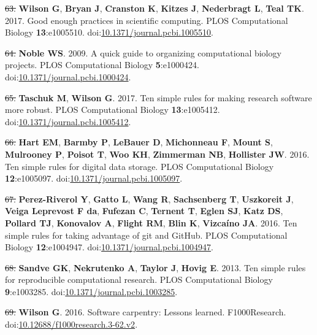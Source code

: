 \documentclass[]{article}
\providecommand{\DIFaddtex}[1]{{\protect\color{blue}\uwave{#1}}} %
\providecommand{\DIFdeltex}[1]{{\protect\color{red}\sout{#1}}}                      %
\providecommand{\DIFaddbegin}{} %
\providecommand{\DIFaddend}{} %
\providecommand{\DIFdelbegin}{} %
\providecommand{\DIFdelend}{} %
\providecommand{\DIFadd}[1]{\texorpdfstring{\DIFaddtex{#1}}{#1}} %
\providecommand{\DIFdel}[1]{\texorpdfstring{\DIFdeltex{#1}}{}} %
\begin{document}
\hypertarget{ref-Wilson2017}{}
\DIFdelbegin \DIFdel{63. }\DIFdelend \DIFaddbegin \DIFadd{65. }\DIFaddend \textbf{Wilson G}, \textbf{Bryan J}, \textbf{Cranston K},
\textbf{Kitzes J}, \textbf{Nederbragt L}, \textbf{Teal TK}. 2017. Good
enough practices in scientific computing. PLOS Computational Biology
\textbf{13}:e1005510.
doi:\href{https://doi.org/10.1371/journal.pcbi.1005510}{10.1371/journal.pcbi.1005510}.

\hypertarget{ref-Noble2009}{}
\DIFdelbegin \DIFdel{64. }\DIFdelend \DIFaddbegin \DIFadd{66. }\DIFaddend \textbf{Noble WS}. 2009. A quick guide to organizing computational
biology projects. PLOS Computational Biology \textbf{5}:e1000424.
doi:\href{https://doi.org/10.1371/journal.pcbi.1000424}{10.1371/journal.pcbi.1000424}.

\hypertarget{ref-Taschuk2017}{}
\DIFdelbegin \DIFdel{65. }\DIFdelend \DIFaddbegin \DIFadd{67. }\DIFaddend \textbf{Taschuk M}, \textbf{Wilson G}. 2017. Ten simple rules for
making research software more robust. PLOS Computational Biology
\textbf{13}:e1005412.
doi:\href{https://doi.org/10.1371/journal.pcbi.1005412}{10.1371/journal.pcbi.1005412}.

\hypertarget{ref-Hart2016}{}
\DIFdelbegin \DIFdel{66. }\DIFdelend \DIFaddbegin \DIFadd{68. }\DIFaddend \textbf{Hart EM}, \textbf{Barmby P}, \textbf{LeBauer D},
\textbf{Michonneau F}, \textbf{Mount S}, \textbf{Mulrooney P},
\textbf{Poisot T}, \textbf{Woo KH}, \textbf{Zimmerman NB},
\textbf{Hollister JW}. 2016. Ten simple rules for digital data storage.
PLOS Computational Biology \textbf{12}:e1005097.
doi:\href{https://doi.org/10.1371/journal.pcbi.1005097}{10.1371/journal.pcbi.1005097}.

\hypertarget{ref-PerezRiverol2016}{}
\DIFdelbegin \DIFdel{67. }\DIFdelend \DIFaddbegin \DIFadd{69. }\DIFaddend \textbf{Perez-Riverol Y}, \textbf{Gatto L}, \textbf{Wang R},
\textbf{Sachsenberg T}, \textbf{Uszkoreit J}, \textbf{Veiga Leprevost F
da}, \textbf{Fufezan C}, \textbf{Ternent T}, \textbf{Eglen SJ},
\textbf{Katz DS}, \textbf{Pollard TJ}, \textbf{Konovalov A},
\textbf{Flight RM}, \textbf{Blin K}, \textbf{Vizcaíno JA}. 2016. Ten
simple rules for taking advantage of git and GitHub. PLOS Computational
Biology \textbf{12}:e1004947.
doi:\href{https://doi.org/10.1371/journal.pcbi.1004947}{10.1371/journal.pcbi.1004947}.

\hypertarget{ref-Sandve2013}{}
\DIFdelbegin \DIFdel{68. }\DIFdelend \DIFaddbegin \DIFadd{70. }\DIFaddend \textbf{Sandve GK}, \textbf{Nekrutenko A}, \textbf{Taylor J},
\textbf{Hovig E}. 2013. Ten simple rules for reproducible computational
research. PLOS Computational Biology \textbf{9}:e1003285.
doi:\href{https://doi.org/10.1371/journal.pcbi.1003285}{10.1371/journal.pcbi.1003285}.

\hypertarget{ref-Wilson2016}{}
\DIFdelbegin \DIFdel{69. }\DIFdelend \DIFaddbegin \DIFadd{71. }\DIFaddend \textbf{Wilson G}. 2016. Software carpentry: Lessons learned.
F1000Research.
doi:\href{https://doi.org/10.12688/f1000research.3-62.v2}{10.12688/f1000research.3-62.v2}.
\end{document}
